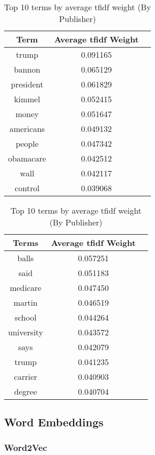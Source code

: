 \documentclass[a4paper, 11pt,titlepage,oneside,openany]{book}
\begin{document}
\begin{table}[t]
	\begin{minipage}{.5\textwidth}
		\begin{tabular}{ccc}
			\toprule
			Term & Average \Gls{tfidf} Weight \\
			\midrule
			trump & 0.091165 \\
			bannon & 0.065129 \\
			president & 0.061829 \\
			kimmel & 0.052415 \\
			money & 0.051647 \\
			americans & 0.049132 \\
			people & 0.047342 \\
			obamacare & 0.042512 \\
			wall & 0.042117 \\
			control & 0.039068 \\
			\bottomrule
		\end{tabular}
		\caption{Top 10 terms by average \Gls{tfidf} weight (By Article)}
	\end{minipage}
	\hspace{0,8cm}
	\begin{minipage}{.5\textwidth}
		\begin{tabular}{ccc}
			\toprule
			Terms & Average \Gls{tfidf} Weight \\
			\midrule
			balls & 0.057251 \\
			said & 0.051183 \\
			medicare & 0.047450 \\
			martin & 0.046519 \\
			school & 0.044264 \\
			university & 0.043572 \\
			says & 0.042079 \\
			trump & 0.041235 \\
			carrier & 0.040903 \\
			degree & 0.040704 \\
			\bottomrule
		\end{tabular}
		\caption{Top 10 terms by average \Gls{tfidf} weight (By Publisher)}
	\end{minipage}
\end{table}

\subsection{Word Embeddings}
\subsubsection{Word2Vec} 
\end{document}
